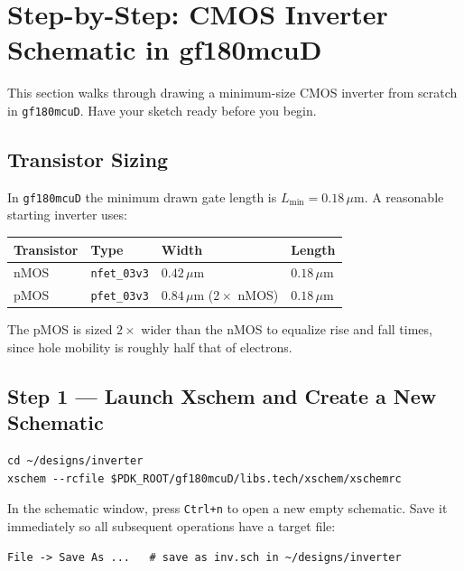 \documentclass[11pt]{article}
\begin{document}
\section{Step-by-Step: CMOS Inverter Schematic in gf180mcuD}

This section walks through drawing a minimum-size CMOS inverter from
scratch in \texttt{gf180mcuD}.
Have your sketch ready before you begin.

\subsection{Transistor Sizing}

In \texttt{gf180mcuD} the minimum drawn gate length is
$L_{\min} = 0.18\,\mu\text{m}$.
A reasonable starting inverter uses:

\begin{center}
\begin{tabular}{@{}llll@{}}
\toprule
\textbf{Transistor} & \textbf{Type} & \textbf{Width} & \textbf{Length} \\
\midrule
nMOS & \texttt{nfet\_03v3} & $0.42\,\mu\text{m}$ & $0.18\,\mu\text{m}$ \\
pMOS & \texttt{pfet\_03v3} & $0.84\,\mu\text{m}$ ($2\times$ nMOS) & $0.18\,\mu\text{m}$ \\
\bottomrule
\end{tabular}
\end{center}

The pMOS is sized $2\times$ wider than the nMOS to equalize rise and
fall times, since hole mobility is roughly half that of electrons.

\subsection{Step 1 --- Launch Xschem and Create a New Schematic}

\begin{lstlisting}
cd ~/designs/inverter
xschem --rcfile $PDK_ROOT/gf180mcuD/libs.tech/xschem/xschemrc
\end{lstlisting}

In the schematic window, press \texttt{Ctrl+n} to open a new empty
schematic.
Save it immediately so all subsequent operations have a target file:

\begin{lstlisting}
File -> Save As ...   # save as inv.sch in ~/designs/inverter
\end{lstlisting}
\end{document}
